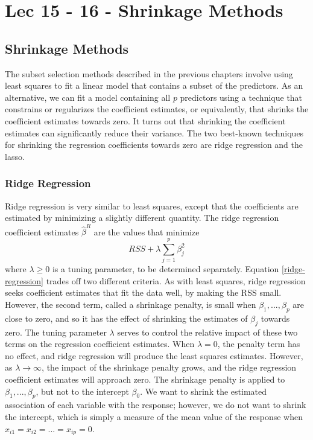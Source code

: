 \chapter{Lec 15 - 16 - Shrinkage Methods}

\section{Shrinkage Methods}
The subset selection methods described in the previous chapters involve using least squares to fit a linear model that contains a subset of the predictors. As an alternative, we can fit a model containing all $p$ predictors using a technique that constrains or regularizes the coefficient estimates, or equivalently, that shrinks the coefficient estimates towards zero. It turns out that shrinking the coefficient estimates can significantly reduce their variance. The two best-known techniques for shrinking the regression coefficients towards zero are ridge regression and the lasso.

\subsection{Ridge Regression}
Ridge regression is very similar to least squares, except that the coefficients are estimated by minimizing a slightly different quantity. The ridge regression coefficient estimates $\hat{\beta}^R$ are the values that minimize
\begin{equation}
    RSS + \lambda \sum_{j=1}^p \beta_j^2
    \label{ridge-regression}
\end{equation}
where $\lambda \geq 0$ is a tuning parameter, to be determined separately. Equation \ref{ridge-regression} trades off two different criteria. As with least squares, ridge regression seeks coefficient estimates that fit the data well, by making the RSS small. However, the second term, called a shrinkage penalty, is small when $\beta_1,...,\beta_p$ are close to zero, and so it has the effect of shrinking the estimates of $\beta_j$ towards zero. The tuning parameter $\lambda$ serves to control the relative impact of these two terms on the regression coefficient estimates. When $\lambda = 0$, the penalty term has no effect, and ridge regression will produce the least squares estimates. However, as $\lambda \rightarrow \infty$, the impact of the shrinkage penalty grows, and the ridge regression coefficient estimates will approach zero. The shrinkage penalty is applied to $\beta_1,...,\beta_p$, but not to the intercept $\beta_0$. We want to shrink the estimated association of each variable with the response; however, we do not want to shrink the intercept, which is simply a measure of the mean value of the response when $x_{i1} = x_{i2} = ... = x_{ip} = 0$.

